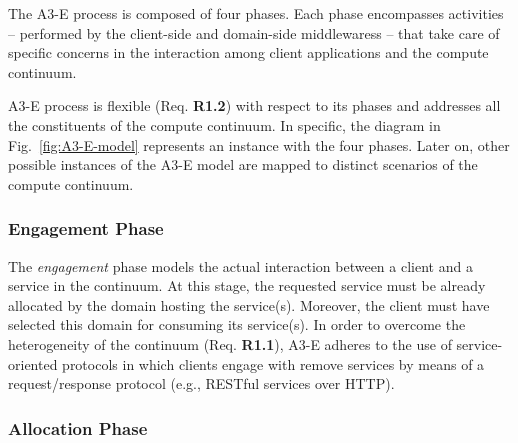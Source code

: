 The A3-E process is composed of four phases. Each phase encompasses activities -- performed by the client-side and domain-side middlewaress -- that take care of specific concerns in the interaction among client applications and the compute continuum. 

A3-E process is flexible (Req. \textbf{R1.2}) with respect to its phases and addresses all the constituents of the compute continuum. In specific, the diagram in Fig.~\ref{fig:A3-E-model} represents an instance with the four phases. Later on, other possible instances of the A3-E model are mapped to distinct scenarios of the compute continuum.


\subsubsection*{Engagement Phase}\label{sec:A3-E-engagement}

The \textit{engagement} phase models the actual interaction between a client and a service in the continuum. At this stage, the requested service must be already allocated by the domain hosting the service(s).  Moreover, the client must have selected this domain for consuming its service(s). In order to overcome the heterogeneity of the continuum (Req. \textbf{R1.1}), A3-E adheres to the use of service-oriented protocols in which clients engage with remove services by means of a request/response protocol (e.g., RESTful services over HTTP).


\subsubsection*{Allocation Phase}\label{sec:A3-E-allocation}

